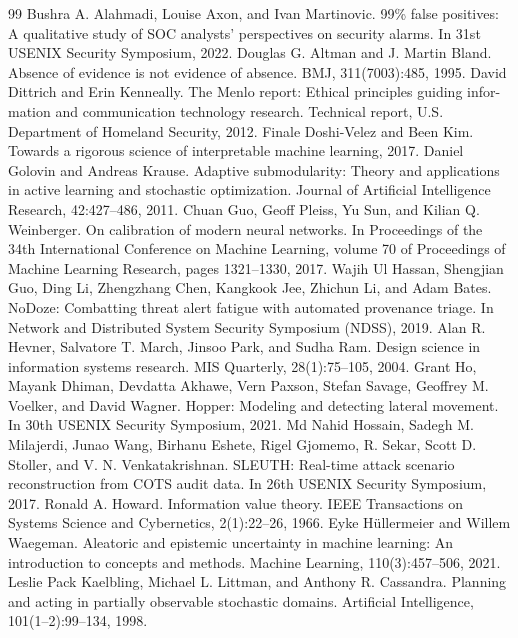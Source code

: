 \documentclass[a4paper,11pt,oneside]{article}
\begin{document}
\begin{thebibliography}{99}
 Bushra A. Alahmadi, Louise Axon, and Ivan Martinovic. 99\% false positives: A qualitative study of SOC analysts’ perspectives on security alarms. In 31st USENIX Security Symposium, 2022.
 Douglas G. Altman and J. Martin Bland. Absence of evidence is not evidence of absence. BMJ, 311(7003):485, 1995.
 David Dittrich and Erin Kenneally. The Menlo report: Ethical principles guiding infor- mation and communication technology research. Technical report, U.S. Department of Homeland Security, 2012.
 Finale Doshi-Velez and Been Kim. Towards a rigorous science of interpretable machine learning, 2017.
 Daniel Golovin and Andreas Krause. Adaptive submodularity: Theory and applications in active learning and stochastic optimization. Journal of Artificial Intelligence Research, 42:427–486, 2011.
 Chuan Guo, Geoff Pleiss, Yu Sun, and Kilian Q. Weinberger. On calibration of modern neural networks. In Proceedings of the 34th International Conference on Machine Learning, volume 70 of Proceedings of Machine Learning Research, pages 1321–1330, 2017.
 Wajih Ul Hassan, Shengjian Guo, Ding Li, Zhengzhang Chen, Kangkook Jee, Zhichun Li, and Adam Bates. NoDoze: Combatting threat alert fatigue with automated provenance triage. In Network and Distributed System Security Symposium (NDSS), 2019.
 Alan R. Hevner, Salvatore T. March, Jinsoo Park, and Sudha Ram. Design science in information systems research. MIS Quarterly, 28(1):75–105, 2004.
 Grant Ho, Mayank Dhiman, Devdatta Akhawe, Vern Paxson, Stefan Savage, Geoffrey M. Voelker, and David Wagner. Hopper: Modeling and detecting lateral movement. In 30th USENIX Security Symposium, 2021.
 Md Nahid Hossain, Sadegh M. Milajerdi, Junao Wang, Birhanu Eshete, Rigel Gjomemo, R. Sekar, Scott D. Stoller, and V. N. Venkatakrishnan. SLEUTH: Real-time attack scenario reconstruction from COTS audit data. In 26th USENIX Security Symposium, 2017.
 Ronald A. Howard. Information value theory. IEEE Transactions on Systems Science and Cybernetics, 2(1):22–26, 1966.
 Eyke Hüllermeier and Willem Waegeman. Aleatoric and epistemic uncertainty in machine learning: An introduction to concepts and methods. Machine Learning, 110(3):457–506, 2021.
 Leslie Pack Kaelbling, Michael L. Littman, and Anthony R. Cassandra. Planning and acting in partially observable stochastic domains. Artificial Intelligence, 101(1–2):99–134, 1998.

\end{thebibliography}
\end{document}
